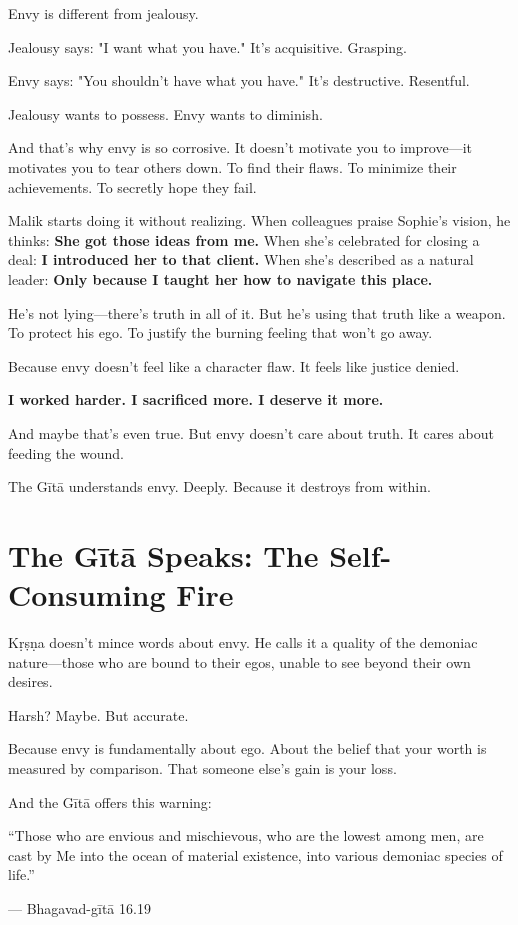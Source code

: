 \documentclass[11pt,twoside]{book}
\begin{document}
Envy is different from jealousy.

Jealousy says: "I want what you have." It's acquisitive. Grasping.

Envy says: "You shouldn't have what you have." It's destructive. Resentful.

Jealousy wants to possess. Envy wants to diminish.

And that's why envy is so corrosive. It doesn't motivate you to improve—it motivates you to tear others down. To find their flaws. To minimize their achievements. To secretly hope they fail.

Malik starts doing it without realizing. When colleagues praise Sophie's vision, he thinks: \textbf{She got those ideas from me.} When she's celebrated for closing a deal: \textbf{I introduced her to that client.} When she's described as a natural leader: \textbf{Only because I taught her how to navigate this place.}

He's not lying—there's truth in all of it. But he's using that truth like a weapon. To protect his ego. To justify the burning feeling that won't go away.

Because envy doesn't feel like a character flaw. It feels like justice denied.

\textbf{I worked harder. I sacrificed more. I deserve it more.}

And maybe that's even true. But envy doesn't care about truth. It cares about feeding the wound.

The Gītā understands envy. Deeply. Because it destroys from within.

\section*{The Gītā Speaks: The Self-Consuming Fire}

Kṛṣṇa doesn't mince words about envy. He calls it a quality of the demoniac nature—those who are bound to their egos, unable to see beyond their own desires.

Harsh? Maybe. But accurate.

Because envy is fundamentally about ego. About the belief that your worth is measured by comparison. That someone else's gain is your loss.

And the Gītā offers this warning:

\begin{pullquote}
``Those who are envious and mischievous, who are the lowest among men, are cast by Me into the ocean of material existence, into various demoniac species of life.''

--- Bhagavad-gītā 16.19
\end{pullquote}
\end{document}
